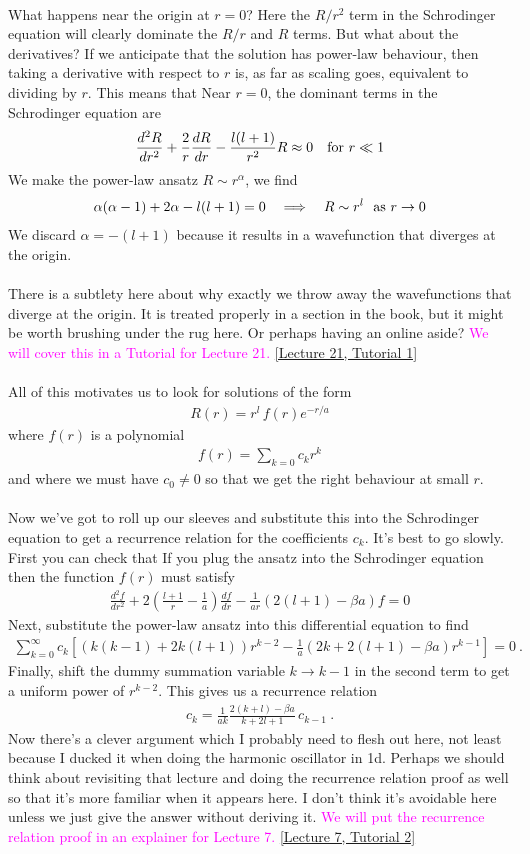 \documentclass[12pt]{article}
\def\be{\begin{eqnarray}}
\def\ee{\end{eqnarray}}
\newcommand{\nn}{\nonumber}
\newcommand\para{\paragraph{}}
\newcommand{\co}{\color{olive}}
\newcommand{\cblue}{\color{blue}}
\newcommand{\alyssa}{\textcolor{magenta}}
\begin{document}
{\para
What happens near the origin at $r=0$? Here the $R/r^2$ term in the Schrodinger equation will clearly dominate the $R/r$ and $R$ terms. But what about the derivatives? If we anticipate that the solution has power-law behaviour, then taking a derivative with respect to $r$ is, as far as scaling goes, equivalent to dividing by $r$. This means that {\co Near $r=0$, the dominant terms in the Schrodinger equation  are
%
\be \frac{d^2R}{dr^2} + \frac{2}{r}\frac{dR}{dr} - \frac{l(l+1)}{r^2}R \approx 0\ \ \ {\rm for}\ r\ll 1\nn\ee
%
We make the power-law ansatz $R\sim r^\alpha$, we find
%
\be \alpha(\alpha-1) + 2\alpha - l(l+1) = 0\ \ \ \Longrightarrow \ \ \ R \sim r^l\ \ {\rm as}\ r\rightarrow 0\ee
%
We discard $\alpha =-(l+1)$ because it results in a wavefunction that diverges at the origin. } 

\para
{\cblue There is a subtlety here about why exactly we throw away the wavefunctions that diverge at the origin. It is treated properly in a section in the book, but it might be worth brushing under the rug here. Or perhaps having an online aside?} \alyssa{We will cover this in a Tutorial for Lecture 21.} \href{https://drive.google.com/file/d/1jBoanjhSDT81TeGmQopiHUfDKjkdjTqB/view?usp=drive_link}{[Lecture 21, Tutorial 1]}


\para
{\co All of this motivates us to look for solutions of the form
%
\be R(r) = r^l\, f(r) e^{-r/a}\nn\ee
%
where $f(r)$ is a polynomial
%
\be f(r) = \sum_{k=0}c_k r^k\nn\ee
%
and where we must have $c_0\neq 0$ so that we get the right behaviour at small $r$. }

\para
Now we've got to roll up our sleeves and substitute this into the Schrodinger equation to get a recurrence relation for the coefficients $c_k$. It's best to go slowly. First you can check that {\co If you plug the ansatz  into the Schrodinger equation then the function $f(r)$ must satisfy
%
\be \frac{d^2f}{dr^2} + 2\left(\frac{l+1}{r} - \frac{1}{a}\right)\frac{df}{dr} - \frac{1}{ar}\left(2(l+1) - \beta a\right)f=0\nn\ee
%
Next, substitute the power-law ansatz  into this differential equation to find
%
\be \sum_{k=0}^\infty c_k\left[ (k(k-1) + 2k(l+1))r^{k-2} - \frac{1}{a}(2k + 2(l+1) - \beta a) r^{k-1}\right]=0\ .\ \ \ \ \ \ \, \nn\ee
Finally, shift the dummy summation variable $k\rightarrow k-1$ in the second term to get a uniform power of $r^{k-2}$. This gives us a recurrence relation
%
\be c_k = \frac{1}{ak} \frac{2(k+l) -\beta a}{k+2l+1}\,c_{k-1}\ .\nn\ee
%
}
Now there's a clever argument {\cblue which I probably need to flesh out here, not least because I ducked it when doing the harmonic oscillator in 1d. Perhaps we should think about revisiting that lecture and doing the recurrence relation proof as well so that it's more familiar when it appears here. I don't think it's avoidable here unless we just give the answer without deriving it.} \alyssa{We will put the recurrence relation proof in an explainer for Lecture 7.} \href{https://drive.google.com/file/d/1-7a5lutZlVQALBmbVPMVMWuM6sbvbxFO/view?usp=drive_link}{[Lecture 7, Tutorial 2]}

}
\end{document}
